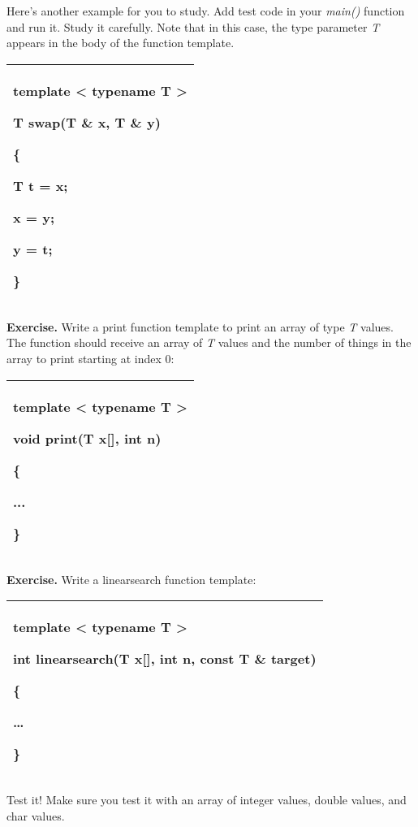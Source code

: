 \documentclass[
]{article}
\begin{document}
Here's another example for you to study. Add test code in your
\emph{main()} function and run it. Study it carefully. Note that in this
case, the type parameter \emph{T} appears in the body of the function
template.

\begin{longtable}[]{@{}l@{}}
\toprule
\endhead
\begin{minipage}[t]{0.97\columnwidth}\raggedright
template \textless{} typename T \textgreater{}

T swap(T \& x, T \& y)

\{

\textbf{T} t = x;

x = y;

y = t;

\}\strut
\end{minipage}\tabularnewline
\bottomrule
\end{longtable}

\textbf{Exercise.} Write a print function template to print an array of
type \emph{T} values. The function should receive an array of \emph{T}
values and the number of things in the array to print starting at index
0:

\begin{longtable}[]{@{}l@{}}
\toprule
\endhead
\begin{minipage}[t]{0.97\columnwidth}\raggedright
template \textless{} typename T \textgreater{}

void print(T x{[}{]}, int n)

\{

...

\}\strut
\end{minipage}\tabularnewline
\bottomrule
\end{longtable}

\textbf{Exercise. }Write a linearsearch function template:

\begin{longtable}[]{@{}l@{}}
\toprule
\endhead
\begin{minipage}[t]{0.97\columnwidth}\raggedright
template \textless{} typename T \textgreater{}

int linearsearch(T x{[}{]}, int n, const T \& target)

\{

\ldots{}

\}\strut
\end{minipage}\tabularnewline
\bottomrule
\end{longtable}

Test it! Make sure you test it with an array of integer values, double
values, and char values.
\end{document}
